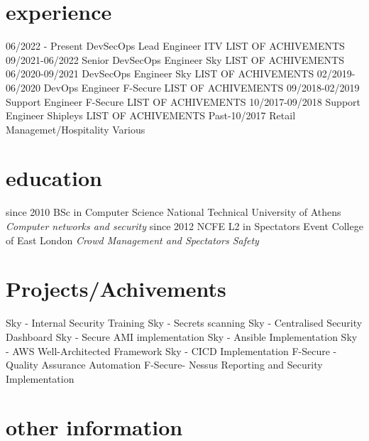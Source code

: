\documentclass[]{twentysecondcv}
\begin{document}
\section{experience}
\begin{twenty}
  \twentyitem
    {06/2022 - Present}
    {DevSecOps Lead Engineer}
    {ITV}
    {LIST OF ACHIVEMENTS}
  \twentyitem
    {09/2021-06/2022}
    { Senior DevSecOps Engineer}
    {Sky}
    {LIST OF ACHIVEMENTS}
  \twentyitem
    {06/2020-09/2021}
    {DevSecOps Engineer}
    {Sky}
    {LIST OF ACHIVEMENTS}
  \twentyitem
    {02/2019-06/2020}
    {DevOps Engineer}
    {F-Secure}
    {LIST OF ACHIVEMENTS}
  \twentyitem
    {09/2018-02/2019}
    {Support Engineer}
    {F-Secure}
    {LIST OF ACHIVEMENTS}
  \twentyitem
    {10/2017-09/2018}
    {Support Engineer}
    {Shipleys}
    {LIST OF ACHIVEMENTS}
  \twentyitem
    {Past-10/2017}
    {Retail Managemet/Hospitality}
    {Various}


\end{twenty}

\section{education}
\begin{twenty}
  \twentyitem
    {since 2010}
    {BSc {\normalfont in Computer Science}}
    {National Technical University of Athens }
    {\emph{Computer networks and security}}
  \twentyitem
    {since 2012}
    {NCFE L2 {\normalfont in Spectators Event}}
    {College of East London}
    {\emph{Crowd Management and Spectators Safety}}

\end{twenty}

\section{Projects/Achivements}
\begin{twentyshort}
  \twentyitemshort
    {}
    {Sky - Internal Security Training}
  \twentyitemshort
    {}
    {Sky - Secrets scanning}
  \twentyitemshort
    {}
    {Sky - Centralised Security Dashboard}
  \twentyitemshort
    {}
    {Sky - Secure AMI implementation}
  \twentyitemshort
    {}
    {Sky - Ansible Implementation}
  \twentyitemshort
    {}
    {Sky - AWS Well-Architected Framework}
  \twentyitemshort
    {}
    {Sky - CICD Implementation}
  \twentyitemshort
    {}
    {F-Secure - Quality Assurance Automation}
  \twentyitemshort
    {}
    {F-Secure- Nessus Reporting and Security Implementation}
\end{twentyshort}


\section{other information}


\end{document}
